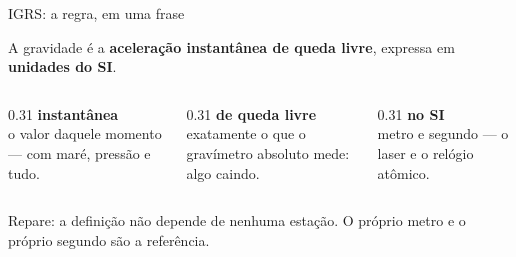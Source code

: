 \documentclass[aspectratio=169,11pt]{beamer}
\newcommand{\bnum}[1]{\textbf{\textcolor{mTeal}{#1}}}
\begin{document}
\begin{frame}{IGRS: a regra, em uma frase}
  \begin{regra}
    \centering
    A gravidade é a \bnum{aceleração instantânea de queda livre}, expressa em \bnum{unidades
    do SI}.
  \end{regra}
  \bigskip
  \begin{columns}[T]
    \begin{column}{0.31\textwidth}
      \textbf{instantânea}\\[2pt]
      {\small o valor daquele momento --- com maré, pressão e tudo.}
    \end{column}
    \begin{column}{0.31\textwidth}
      \textbf{de queda livre}\\[2pt]
      {\small exatamente o que o gravímetro absoluto mede: algo caindo.}
    \end{column}
    \begin{column}{0.31\textwidth}
      \textbf{no SI}\\[2pt]
      {\small metro e segundo --- o laser e o relógio atômico.}
    \end{column}
  \end{columns}
  \bigskip
  \centering
  Repare: a definição não depende de nenhuma estação. \alert{O próprio metro e o próprio
  segundo são a referência.}
\end{frame}
\end{document}
